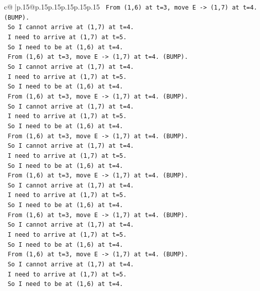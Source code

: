 \documentclass{article}
\begin{document}
{\begin{supertabular}{c@{$\;$}|p{.15\linewidth}@{}p{.15\linewidth}p{.15\linewidth}p{.15\linewidth}p{.15\linewidth}p{.15\linewidth}}
{{{\texttt{   From (1,6) at t=3, move E {-}> (1,7) at t=4. (BUMP).} \\
\texttt{   So I cannot arrive at (1,7) at t=4.} \\
\texttt{   I need to arrive at (1,7) at t=5.} \\
\texttt{   So I need to be at (1,6) at t=4.} \\
\texttt{   From (1,6) at t=3, move E {-}> (1,7) at t=4. (BUMP).} \\
\texttt{   So I cannot arrive at (1,7) at t=4.} \\
\texttt{   I need to arrive at (1,7) at t=5.} \\
\texttt{   So I need to be at (1,6) at t=4.} \\
\texttt{   From (1,6) at t=3, move E {-}> (1,7) at t=4. (BUMP).} \\
\texttt{   So I cannot arrive at (1,7) at t=4.} \\
\texttt{   I need to arrive at (1,7) at t=5.} \\
\texttt{   So I need to be at (1,6) at t=4.} \\
\texttt{   From (1,6) at t=3, move E {-}> (1,7) at t=4. (BUMP).} \\
\texttt{   So I cannot arrive at (1,7) at t=4.} \\
\texttt{   I need to arrive at (1,7) at t=5.} \\
\texttt{   So I need to be at (1,6) at t=4.} \\
\texttt{   From (1,6) at t=3, move E {-}> (1,7) at t=4. (BUMP).} \\
\texttt{   So I cannot arrive at (1,7) at t=4.} \\
\texttt{   I need to arrive at (1,7) at t=5.} \\
\texttt{   So I need to be at (1,6) at t=4.} \\
\texttt{   From (1,6) at t=3, move E {-}> (1,7) at t=4. (BUMP).} \\
\texttt{   So I cannot arrive at (1,7) at t=4.} \\
\texttt{   I need to arrive at (1,7) at t=5.} \\
\texttt{   So I need to be at (1,6) at t=4.} \\
\texttt{   From (1,6) at t=3, move E {-}> (1,7) at t=4. (BUMP).} \\
\texttt{   So I cannot arrive at (1,7) at t=4.} \\
\texttt{   I need to arrive at (1,7) at t=5.} \\
\texttt{   So I need to be at (1,6) at t=4.} \\
}}}
\end{supertabular}}
\end{document}
